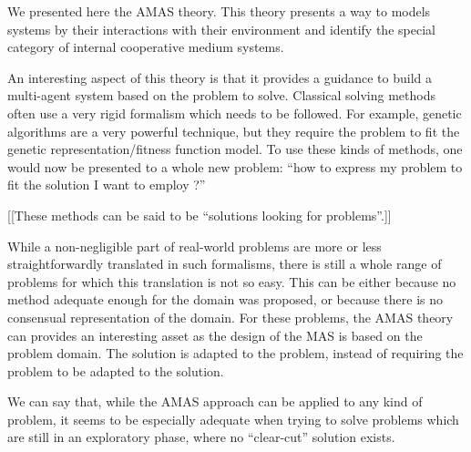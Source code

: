 We presented here the AMAS theory. This theory presents a way to models systems by their interactions with their environment and identify the special category of internal cooperative medium systems.

An interesting aspect of this theory  is that it provides a guidance to build a multi-agent system based on the problem to solve. Classical solving methods often use a very rigid formalism which needs to be followed. For example, genetic algorithms are a very powerful technique, but they require the problem to fit the genetic representation/fitness function model. To use these kinds of methods, one would now be presented to a whole new problem: \enquote{how to express my problem to fit the solution I want to employ ?}

[[These methods can be said to be \enquote{solutions looking for problems}.]]

While a non-negligible part of real-world problems are more or less straightforwardly translated in such formalisms, there is still a whole range of problems for which this translation is not so easy. This can be either because no method adequate enough for the domain was proposed, or because there is no consensual representation of the domain. For these problems, the AMAS theory can provides an interesting asset as the design of the MAS is based on the problem domain. The solution is adapted to the problem, instead of requiring the problem to be adapted to the solution.

We can say that, while the AMAS approach can be applied to any kind of problem, it seems to be especially adequate when trying to solve problems which are still in an exploratory phase, where no \enquote{clear-cut} solution exists.


